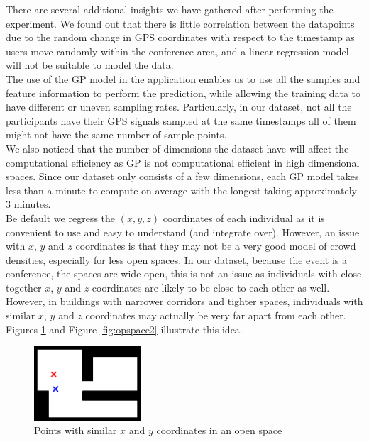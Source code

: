 \documentclass[letterpaper]{article}
\begin{document}
There are several additional insights we have gathered after performing the experiment. We found out that there is little correlation between the datapoints due to the random change in GPS coordinates with respect to the timestamp as users move randomly within the conference area, and a linear regression model will not be suitable to model the data. \\

The use of the GP model in the application enables us to use all the samples and feature information to perform the prediction, while allowing the training data to have different or uneven sampling rates. Particularly, in our dataset, not all the participants have their GPS signals sampled at the same timestamps all of them might not have the same number of sample points. \\

We also noticed that the number of dimensions the dataset have will affect the computational efficiency as GP is not computational efficient in high dimensional spaces. Since our dataset only consists of a few dimensions, each GP model takes less than a minute to compute on average with the longest taking approximately 3 minutes.\\

Be default we regress the $(x,y,z)$ coordinates of each individual as it is convenient to use and easy to understand (and integrate over). However, an issue with $x$, $y$ and $z$ coordinates is that they may not be a very good model of crowd densities, especially for less open spaces. In our dataset, because the event is a conference, the spaces are wide open, this is not an issue as individuals with close together $x$, $y$ and $z$ coordinates are likely to be close to each other as well. However, in buildings with narrower corridors and tighter spaces, individuals with similar $x$, $y$ and $z$ coordinates may actually be very far apart from each other. Figures \ref{fig:opspace1} and Figure \ref{fig:opspace2} illustrate this idea.

\begin{figure}[h!]
  \centering
    \includegraphics[width=150px,natwidth=634,natheight=442]{openspace1.png}
  \caption{Points with similar $x$ and $y$ coordinates in an open space}
  \label{fig:opspace1}
\end{figure}
\end{document}
